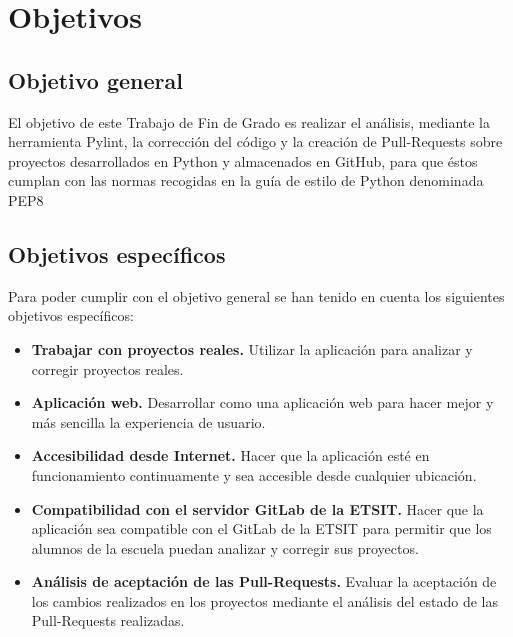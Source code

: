 \documentclass[a4paper, 12pt]{book}
\begin{document}
\chapter{Objetivos} %
\label{chap:objetivos} %

\section{Objetivo general} %
\label{sec:objetivo-general} %

El objetivo de este Trabajo de Fin de Grado es realizar el análisis, mediante la herramienta Pylint, la corrección del código y la creación de Pull-Requests sobre proyectos desarrollados en Python y almacenados en GitHub, para que éstos cumplan con las normas recogidas en la guía de estilo de Python denominada PEP8

\section{Objetivos específicos}
\label{sec:objetivos-especificos}

Para poder cumplir con el objetivo general se han tenido en cuenta los siguientes objetivos específicos:

\begin{itemize}
	\item \textbf{Trabajar con proyectos reales.} Utilizar la aplicación para analizar y corregir proyectos reales.
	\item \textbf{Aplicación web.} Desarrollar como una aplicación web para hacer mejor y más sencilla la experiencia de usuario.
	\item \textbf{Accesibilidad desde Internet.} Hacer que la aplicación esté en funcionamiento continuamente y sea accesible desde cualquier ubicación.
	\item \textbf{Compatibilidad con el servidor GitLab de la ETSIT.} Hacer que la aplicación sea compatible con el GitLab de la ETSIT para permitir que los alumnos de la escuela puedan analizar y corregir sus proyectos.
	\item \textbf{Análisis de aceptación de las Pull-Requests.} Evaluar la aceptación de los cambios realizados en los proyectos mediante el análisis del estado de las Pull-Requests realizadas.
\end{itemize}
\end{document}
